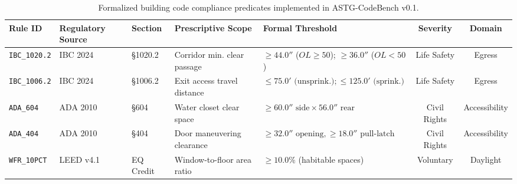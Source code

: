 \begin{table}[t]
\centering
\small
\caption{Formalized building code compliance predicates implemented in ASTG-CodeBench v0.1.}
\label{tab:rule_predicates}
\begin{tabular}{lllllcc}
\toprule
\textbf{Rule ID} & \textbf{Regulatory Source} & \textbf{Section} & \textbf{Prescriptive Scope} & \textbf{Formal Threshold} & \textbf{Severity} & \textbf{Domain} \\
\midrule
\texttt{IBC\_1020.2} & IBC 2024 & \S 1020.2 & Corridor min. clear passage & $\ge 44.0''$ ($OL \ge 50$); $\ge 36.0''$ ($OL < 50$) & Life Safety & Egress \\
\texttt{IBC\_1006.2} & IBC 2024 & \S 1006.2 & Exit access travel distance & $\le 75.0'\text{ (unsprink.)}; \le 125.0'\text{ (sprink.)}$ & Life Safety & Egress \\
\texttt{ADA\_604}    & ADA 2010 & \S 604    & Water closet clear space    & $\ge 60.0''\text{ side} \times 56.0''\text{ rear}$ & Civil Rights & Accessibility \\
\texttt{ADA\_404}    & ADA 2010 & \S 404    & Door maneuvering clearance  & $\ge 32.0''\text{ opening}, \ge 18.0''\text{ pull-latch}$ & Civil Rights & Accessibility \\
\texttt{WFR\_10PCT}  & LEED v4.1 & EQ Credit & Window-to-floor area ratio  & $\ge 10.0\%$ (habitable spaces) & Voluntary & Daylight \\
\bottomrule
\end{tabular}
\end{table}
